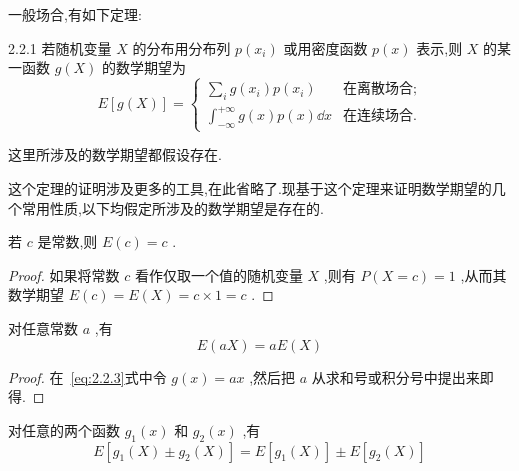 一般场合,有如下定理:
\begin{theorem}{}{2.2.1}
	若随机变量 $ X $ 的分布用分布列 $ p(x_i) $ 或用密度函数 $ p(x) $ 表示,则 $ X $ 的某一函数 $ g(X) $ 的数学期望为
	\begin{equation}
	E[g(X)]=\left\{\begin{array}{ll}
	{\sum_{i} g\left(x_{i}\right) p\left(x_{i}\right)}&{\text{在离散场合;}} \\ {\int_{-\infty}^{+\infty} g(x) p(x) \dd x} &{\text{在连续场合.}} 
	\end{array}\right. \label{eq:2.2.3}
	\end{equation}
	
	这里所涉及的数学期望都假设存在.
	
\end{theorem}

这个定理的证明涉及更多的工具,在此省略了.现基于这个定理来证明数学期望的几个常用性质,以下均假定所涉及的数学期望是存在的.

\begin{property}
	
	若 $ c $ 是常数,则 $ E(c)=c $ .
	
\end{property}

\begin{proof}
	如果将常数 $ c $ 看作仅取一个值的随机变量 $ X $ ,则有 $ P(X=c)=1 $ ,从而其数学期望 $ E(c)=E(X)=c \times 1=c $ .
\end{proof}

\begin{property}
	对任意常数 $ a $ ,有
	\begin{equation}
	E ( a X ) = a E ( X ) \label{eq:2.2.4}
	\end{equation}
	
\end{property}

\begin{proof}
	在~\ref{eq:2.2.3}式中令 $ g(x)=ax $ ,然后把 $ a $ 从求和号或积分号中提出来即得.
\end{proof}

\begin{property}
	对任意的两个函数 $ g_1(x) $ 和 $ g_2(x) $ ,有
	\begin{equation}
	E \left[ g _ { 1 } ( X ) \pm g _ { 2 } ( X ) \right] = E \left[ g _ { 1 } ( X ) \right] \pm E \left[ g _ { 2 } ( X ) \right] \label{eq:2.2.5}
	\end{equation}
	
\end{property}


